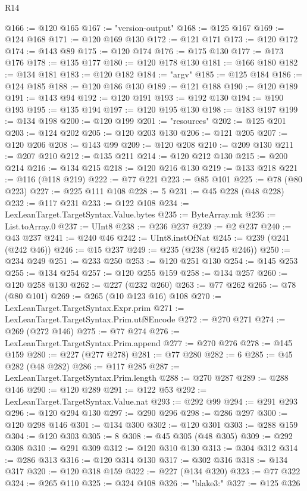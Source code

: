 \begin{lexlean}{R14}
\begin{coremodule}
{{{{{{{{{{{{{{{{{{{{{{{{{{{{{{{{{{{{{{{{{{{{{{{{{{{{{{{{{{{{{{{{{{{{{{{{{{{{{{{{{{{{{{{{{{{{{{{{{{{{{{{{{{@166 := @120 @165
@167 := "version-output"
@168 := @125 @167
@169 := @124 @168
@171 := @120 @169 @130
@172 := @121 @171
@173 := @120 @172
@174 := @143 @89
@175 := @120 @174
@176 := @175 @130
@177 := @173 @176
@178 := @135 @177
@180 := @120 @178 @130
@181 := @166 @180
@182 := @134 @181
@183 := @120 @182
@184 := "argv"
@185 := @125 @184
@186 := @124 @185
@188 := @120 @186 @130
@189 := @121 @188
@190 := @120 @189
@191 := @143 @94
@192 := @120 @191
@193 := @192 @130
@194 := @190 @193
@195 := @135 @194
@197 := @120 @195 @130
@198 := @183 @197
@199 := @134 @198
@200 := @120 @199
@201 := "resources"
@202 := @125 @201
@203 := @124 @202
@205 := @120 @203 @130
@206 := @121 @205
@207 := @120 @206
@208 := @143 @99
@209 := @120 @208
@210 := @209 @130
@211 := @207 @210
@212 := @135 @211
@214 := @120 @212 @130
@215 := @200 @214
@216 := @134 @215
@218 := @120 @216 @130
@219 := @133 @218
@221 := @116 (@118 @219)
@222 := @77 @221
@223 := @85 @101
@225 := @78 (@80 @223)
@227 := @225 @111 @108
@228 := 5
@231 := @45 @228 (@48 @228)
@232 := @117 @231
@233 := @122 @108
@234 := LexLeanTarget.TargetSyntax.Value.bytes
@235 := ByteArray.mk
@236 := List.toArray.{0}
@237 := UInt8
@238 := @236 @237
@239 := @2 @237
@240 := @43 @237
@241 := @240 @46
@242 := UInt8.instOfNat
@245 := @239 (@241 (@242 @46))
@246 := @15 @237
@249 := @235 (@238 (@245 @246))
@250 := @234 @249
@251 := @233 @250
@253 := @120 @251 @130
@254 := @145 @253
@255 := @134 @254
@257 := @120 @255 @159
@258 := @134 @257
@260 := @120 @258 @130
@262 := @227 (@232 @260)
@263 := @77 @262
@265 := @78 (@80 @101)
@269 := @265 (@10 @123 @16) @108
@270 := LexLeanTarget.TargetSyntax.Expr.prim
@271 := LexLeanTarget.TargetSyntax.Prim.utf8Encode
@272 := @270 @271
@274 := @269 (@272 @146)
@275 := @77 @274
@276 := LexLeanTarget.TargetSyntax.Prim.append
@277 := @270 @276
@278 := @145 @159
@280 := @227 (@277 @278)
@281 := @77 @280
@282 := 6
@285 := @45 @282 (@48 @282)
@286 := @117 @285
@287 := LexLeanTarget.TargetSyntax.Prim.length
@288 := @270 @287
@289 := @288 @146
@290 := @120 @289
@291 := @122 @53
@292 := LexLeanTarget.TargetSyntax.Value.nat
@293 := @292 @99
@294 := @291 @293
@296 := @120 @294 @130
@297 := @290 @296
@298 := @286 @297
@300 := @120 @298 @146
@301 := @134 @300
@302 := @120 @301
@303 := @288 @159
@304 := @120 @303
@305 := 8
@308 := @45 @305 (@48 @305)
@309 := @292 @308
@310 := @291 @309
@312 := @120 @310 @130
@313 := @304 @312
@314 := @286 @313
@316 := @120 @314 @130
@317 := @302 @316
@318 := @134 @317
@320 := @120 @318 @159
@322 := @227 (@134 @320)
@323 := @77 @322
@324 := @265 @110
@325 := @324 @108
@326 := "blake3:"
@327 := @125 @326
}}}}}}}}}}}}}}}}}}}}}}}}}}}}}}}}}}}}}}}}}}}}}}}}}}}}}}}}}}}}}}}}}}}}}}}}}}}}}}}}}}}}}}}}}}}}}}}}}}}}}}}}}}
\end{coremodule}
\end{lexlean}
